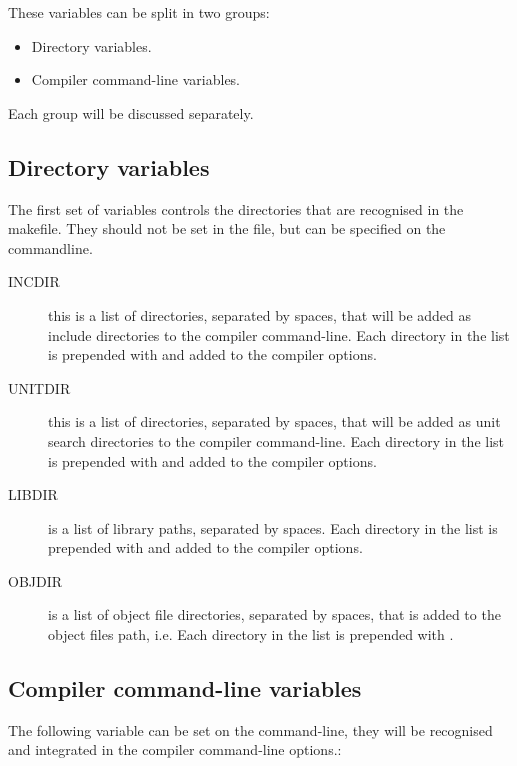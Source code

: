 {These variables can be split in two groups:
\begin{itemize}
\item Directory variables.
\item Compiler command-line variables.
\end{itemize}
Each group will be discussed separately.

\subsection{Directory variables}

The first set of variables controls the directories that are
recognised in the makefile. They should not be set in the
 file, but can be specified on the commandline.
\begin{description}
\item[INCDIR] this is a list of directories, separated by spaces, that will
be added as include directories to the compiler command-line.  Each
directory in the list is prepended with  and added to the
compiler options.
\item[UNITDIR] this is a list of directories, separated by spaces, that will
be added as unit search directories to the compiler command-line.  Each
directory in the list is prepended with  and added to the
compiler options.
\item[LIBDIR] is a list of library paths, separated by spaces. Each
directory in the list is prepended with  and added to the
compiler options.
\item[OBJDIR] is a list of object file directories, separated by spaces, that is
added to the object files path, i.e. Each directory in the list is prepended with
.
\end{description}

\subsection{Compiler command-line variables }
The following variable can be set on the  command-line,
they will be recognised and integrated in the compiler command-line options.:

}
